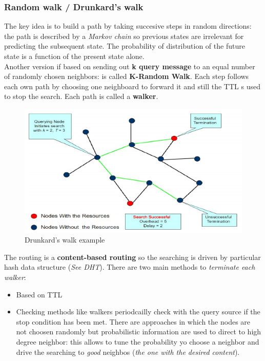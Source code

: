 \documentclass[10pt,a4paper]{report}
\begin{document}
\subsubsection{Random walk / Drunkard's walk}\label{sec:random-walk--drunkards-walk}
The key idea is to build a path by taking succesive steps in random directions: the path is described by a \textit{Markov chain} so previous states are irrelevant for predicting the subsequent state. The probability of distribution of the future state is a function of the present state alone.
\\
Another version if based on sending out \textbf{k query message} to an equal number of randomly chosen neighbors: is called \textbf{K-Random Walk}. Each step follows each own path by choosing one neighboard to forward it and still the TTL s used to stop the search. Each path is called a \textbf{walker}.
\begin{figure}[h]
	\centering
	\includegraphics[scale=0.60]{images/Pasted image 20230301113813.png}
	\caption{Drunkard's walk example}
	\label{drunkard-walk}
\end{figure}


The routing is a \textbf{content-based routing} so the searching is driven by particular hash data structure (\textit{See DHT}). %
There are two main methods to \textit{terminate each walker}:
\begin{itemize}
	\item 
	Based on TTL
	\item 
	Checking methods like walkers periodcailly check with the query source if the stop condition has been met.
	There are approaches in which the nodes are not choosen randomly but probabilistic information are used to direct to high degree neighbor: this allows to tune the probability yo choose a neighbor and drive the searching to \textit{good} neighbos (\textit{the one with the desired content}).
\end{itemize}
\end{document}
